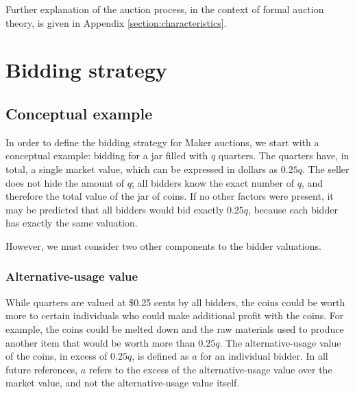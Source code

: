 \documentclass[conference]{IEEEtran}
\begin{document}
Further explanation of the auction process, in the context of formal auction theory, is given in Appendix \ref{section:characteristics}.

\section{Bidding strategy}
\label{sec:strategy}
\subsection{Conceptual example}
In order to define the bidding strategy for Maker auctions, we start with a conceptual example: bidding for a jar filled with $q$ quarters. The quarters have, in total, a single market value, which can be expressed in dollars as $0.25q$. The seller does not hide the amount of $q$; all bidders know the exact number of $q$, and therefore the total value of the jar of coins. If no other factors were present, it may be predicted that all bidders would bid exactly $0.25q$, because each bidder has exactly the same valuation.

However, we must consider two other components to the bidder valuations.
\subsubsection{Alternative-usage value} While quarters are valued at \$0.25 cents by all bidders, the coins could be worth more to certain individuals who could make additional profit with the coins. For example, the coins could be melted down and the raw materials used to produce another item that would be worth more than $0.25q$. The alternative-usage value of the coins, in excess of $0.25q$, is defined as $a$ for an individual bidder. In all future references, $a$ refers to the excess of the alternative-usage value over the market value, and not the alternative-usage value itself.
\end{document}
